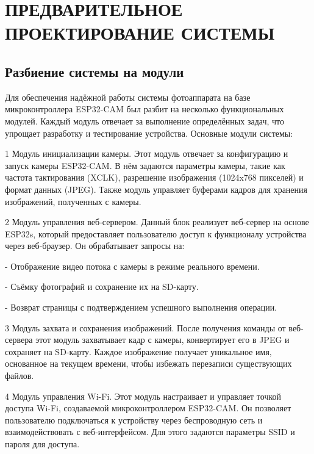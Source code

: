\chapter[Предварительное проеектирование системы]{ПРЕДВАРИТЕЛЬНОЕ ПРОЕКТИРОВАНИЕ СИСТЕМЫ}

\section{Разбиение системы на модули}
\hspace*{12.5 mm}Для обеспечения надёжной работы системы 
фотоаппарата на базе микроконтроллера ESP32-CAM был разбит
на несколько функциональных модулей. 
Каждый модуль отвечает за выполнение определённых задач, что 
упрощает разработку и тестирование устройства. Основные модули 
системы:

    1 Модуль инициализации камеры.
Этот модуль отвечает за конфигурацию и запуск камеры ESP32-CAM. 
В нём задаются параметры камеры, такие как частота тактирования 
(XCLK), разрешение изображения (1024x768 пикселей) и формат 
данных (JPEG). Также модуль управляет буферами кадров для 
хранения изображений, полученных с камеры.

    2 Модуль управления веб-сервером.
Данный блок реализует веб-сервер на основе ESP32s, который предоставляет 
пользователю доступ к функционалу устройства через веб-браузер. 
Он обрабатывает запросы на:
    
    - Отображение видео потока с камеры в режиме реального времени.

    - Съёмку фотографий и сохранение их на SD-карту.

    - Возврат страницы с подтверждением успешного выполнения операции.

    3 Модуль захвата и сохранения изображений.
После получения команды от веб-сервера этот модуль захватывает 
кадр с камеры, конвертирует его в JPEG и сохраняет на SD-карту. 
Каждое изображение получает уникальное имя, основанное на 
текущем времени, чтобы избежать перезаписи существующих файлов.

    4 Модуль управления Wi-Fi.
Этот модуль настраивает и управляет точкой доступа Wi-Fi, 
создаваемой микроконтроллером ESP32-CAM. Он позволяет пользователю 
подключаться к устройству через беспроводную сеть и 
взаимодействовать с веб-интерфейсом. Для этого задаются 
параметры SSID и пароля для доступа.

